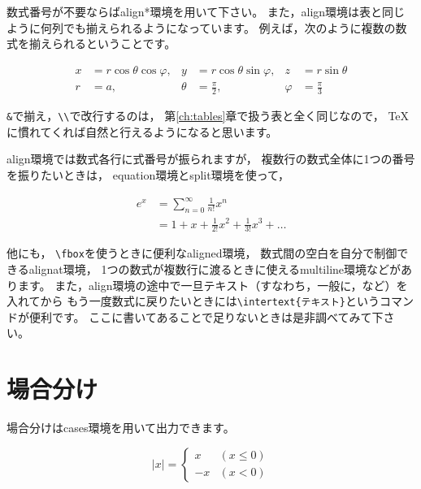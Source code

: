 数式番号が不要ならばalign*環境を用いて下さい。
また，align環境は表と同じように何列でも揃えられるようになっています。
例えば，次のように複数の数式を揃えられるということです。
\begin{IOTeX*}
\begin{align*}
x & = r \cos\theta \cos\varphi, & y & = r \cos\theta \sin\varphi, & z & = r \sin\theta \\
r & = a, & \theta & = \frac{\pi}{2}, & \varphi & = \frac{\pi}{3}
\end{align*}
\end{IOTeX*}

\verb|&|で揃え，\verb|\\|で改行するのは，
第\ref{ch:tables}章で扱う表と全く同じなので，
{\TeX}に慣れてくれば自然と行えるようになると思います。

align環境では数式各行に式番号が振られますが，
複数行の数式全体に1つの番号を振りたいときは，
equation環境とsplit環境を使って，
\begin{IOTeX}
\begin{equation}
  \begin{split}
    e^x & = \sum_{n=0}^{\infty} \frac{1}{n!} x^n \\
      & = 1 + x + \frac{1}{2!} x^2 + \frac{1}{3!} x^3 + \dots 
  \end{split}
\end{equation}
\end{IOTeX}

他にも，
\verb|\fbox|を使うときに便利なaligned環境，
数式間の空白を自分で制御できるalignat環境，
1つの数式が複数行に渡るときに使えるmultiline環境などがあります。
また，align環境の途中で一旦テキスト（すなわち，一般に，など）を入れてから
もう一度数式に戻りたいときには\verb|\intertext{テキスト}|というコマンドが便利です。
ここに書いてあることで足りないときは是非調べてみて下さい。



\section{場合分け}
場合分けはcases環境を用いて出力できます。

\begin{IOTeX}
\[
| x | =
\begin{cases}
x & (x \leq 0) \\
-x & (x < 0)
\end{cases}
\]
\end{IOTeX}



